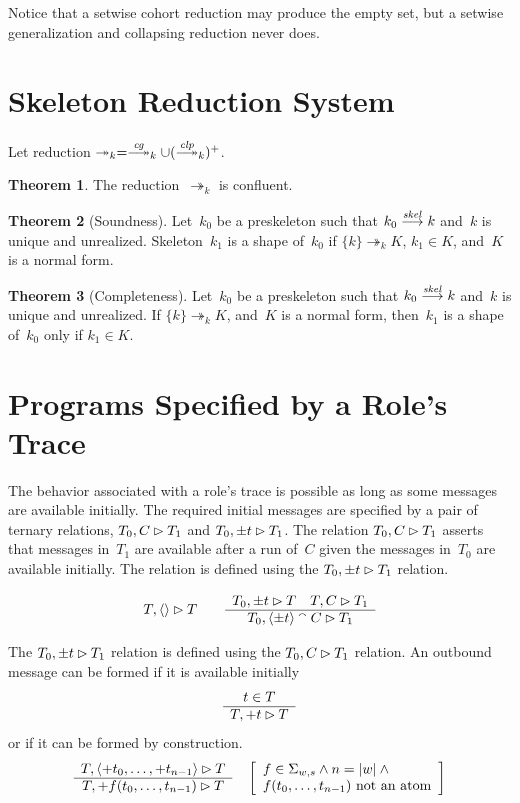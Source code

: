 \documentclass[12pt]{article}
\theoremstyle{definition}
\newtheorem{thm}{Theorem}[section]
\begin{document}
Notice that a setwise cohort reduction may produce the empty set, but
a setwise generalization and collapsing reduction never does.

\section{Skeleton Reduction System}\label{sec:skeleton reduction}

Let reduction
$\twoheadrightarrow_k=\setreduction{\fn{cg}}_k\cup
(\setreduction{\fn{clp}}_k)^+$.
\begin{thm}
The reduction~$\twoheadrightarrow_k$ is confluent.
\end{thm}

\begin{thm}[Soundness]
Let~$k_0$ be a preskeleton such that $k_0\stackrel{\operatorname{\mathit{skel}}}{\longrightarrow}k$
and~$k$ is unique and unrealized.  Skeleton~$k_1$ is a shape of~$k_0$
if $\{k\}\twoheadrightarrow_k K$, $k_1\in K$, and~$K$ is a normal
form.
\end{thm}

\begin{thm}[Completeness]
Let~$k_0$ be a preskeleton such that $k_0\stackrel{\operatorname{\mathit{skel}}}{\longrightarrow}k$
and~$k$ is unique and unrealized.  If $\{k\}\twoheadrightarrow_k K$,
and~$K$ is a normal form, then~$k_1$ is a shape of~$k_0$ only if
$k_1\in K$.
\end{thm}
\appendix

\section{Programs Specified by a Role's Trace}\label{sec:traces}

The behavior associated with a role's trace is possible as long as some
messages are available initially.  The required initial messages are
specified by a pair of ternary relations, $T_0,C\rhd T_1$ and
$T_0,\pm t\rhd T_1$.  The relation $T_0,C\rhd T_1$ asserts
that messages in~$T_1$ are available after a run of~$C$ given the
messages in~$T_0$ are available initially.  The relation is defined
using the $T_0,\pm t\rhd T_1$ relation.

$$\flow{T}{\seq{}}{T}\qquad
\infer{\flow{T_0}{\pm t}{T}\quad\flow{T}{C}{T_1}}%
{\flow{T_0}{\seq{\pm t}\append C}{T_1}}$$

The $T_0,\pm t\rhd T_1$ relation is defined using the
$T_0,C\rhd T_1$ relation.  An outbound message can be formed if
it is available initially
$$\begin{array}{c}t\in T\\\hline T,+t\rhd T\end{array}$$
or if it can be formed by construction.
$$\infer{\flow{T}{\seq{+t_0,\ldots,+t_{n-1}}}{T}}%
{\flow{T}{+f(t_0,\ldots,t_{n-1})}{T}}\quad
\left[\begin{array}{l}
f\in\Sigma_{w,s}\land n=|w|\land {}\\
\mbox{$f(t_0,\ldots,t_{n-1})$ not an atom}
\end{array}\right]$$
\end{document}
